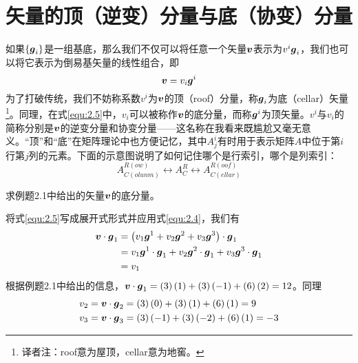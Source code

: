 \section{矢量的顶（逆变）分量与底（协变）分量}
如果$\left\{ \boldsymbol{g}_i \right\} $是一组基底，那么我们不仅可以将任意一个矢量$\boldsymbol{v}$表示为$v^i\boldsymbol{g}_i$，我们也可以将它表示为倒易基矢量的线性组合，即
\begin{equation}\label{equ:2.5}
    \boldsymbol{v}=v_i\boldsymbol{g}^i
\end{equation}
为了打破传统，我们不妨称系数$v^i$为$\boldsymbol{v}$的顶（roof）分量，称$\boldsymbol{g}_i$为底（cellar）矢量\footnote{译者注：roof意为屋顶，cellar意为地窖。}。同理，在式\eqref{equ:2.5}中，$v_i$可以被称作$\boldsymbol{v}$的底分量，而称$\boldsymbol{g}^i$为顶矢量。$v^i$与$v_i$的简称分别是$\boldsymbol{v}$的逆变分量和协变分量——这名称在我看来既尴尬又毫无意义。“顶”和“底”在矩阵理论中也方便记忆，其中$A^i_j$有时用于表示矩阵$A$中位于第$ i $行第$ j $列的元素。下面的示意图说明了如何记住哪个是行索引，哪个是列索引：
\begin{equation*}
    A_{C\left( olunm \right)}^{R\left( ow \right)}\leftrightarrow A_{C}^{R}\leftrightarrow A_{C\left( ellar \right)}^{R\left( oof \right)}
\end{equation*}

\begin{example}
    求例题2.1中给出的矢量$\boldsymbol{v}$的底分量。
\end{example}
\begin{solution}
    将式\eqref{equ:2.5}写成展开式形式并应用式\eqref{equ:2.4}，我们有
    \begin{align*}
        \boldsymbol{v}\cdot \boldsymbol{g}_1&=\left( v_1\boldsymbol{g}^1+v_2\boldsymbol{g}^2+v_3\boldsymbol{g}^3 \right) \cdot \boldsymbol{g}_1\\
        &=v_1\boldsymbol{g}^1\cdot \boldsymbol{g}_1+v_2\boldsymbol{g}^2\cdot \boldsymbol{g}_1+v_3\boldsymbol{g}^3\cdot \boldsymbol{g}_1\\
        &=v_1
    \end{align*}
    根据例题2.1中给出的信息，$\boldsymbol{v}\cdot \boldsymbol{g}_1=\left( 3 \right) \left( 1 \right) +\left( 3 \right) \left( -1 \right) +\left( 6 \right) \left( 2 \right) =12$。同理
    \begin{align*}
        v_2&=\boldsymbol{v}\cdot \boldsymbol{g}_2=\left( 3 \right) \left( 0 \right) +\left( 3 \right) \left( 1 \right) +\left( 6 \right) \left( 1 \right) =9\\
        v_3&=\boldsymbol{v}\cdot \boldsymbol{g}_3=\left( 3 \right) \left( -1 \right) +\left( 3 \right) \left( -2 \right) +\left( 6 \right) \left( 1 \right) =-3
    \end{align*}
\end{solution}

